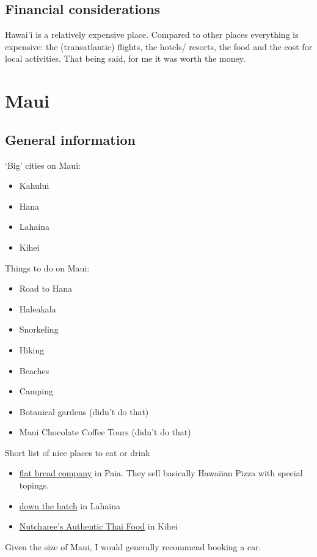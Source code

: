 \documentclass[11pt,a4paper,sans,english]{article}
\begin{document}
\subsection{Financial considerations}
Hawai'i is a relatively expensive place. Compared to other places everything is expensive: the (transatlantic) flights, the hotels/ resorts, the food and the cost for local activities.
That being said, for me it was worth the money.
\section{Maui}
\subsection{General information}
`Big' cities on Maui:
\begin{itemize}
	\itemsep-0.5em 
	\item Kahului
	\item Hana
	\item Lahaina
	\item Kihei
\end{itemize}
Things to do on Maui:
\begin{itemize}
	\itemsep-0.5em 
	\item Road to Hana
	\item Haleakala
	\item Snorkeling
	\item Hiking
	\item Beaches
	\item Camping
	\item Botanical gardens (didn't do that)
	\item Maui Chocolate Coffee Tours (didn't do that)
\end{itemize}
Short list of nice places to eat or drink
\begin{itemize}
	\itemsep-0.5em 
	\item \href{https://flatbreadcompany.com/}{flat bread company} in Paia. They sell basically Hawaiian Pizza with special topings.
	\item \href{https://www.dthmaui.com/lunch-dinner-menu/}{down the hatch} in Lahaina
	\item \href{https://www.google.com/maps/place/Nutcharee's+Authentic+Thai+Food/@20.7489383,-156.4577975,19z/data=!4m10!1m3!2m2!1sRestaurants!6e5!3m5!1s0x7954d041fd44637b:0x745d4c979ca5c0b3!8m2!3d20.7489383!4d-156.4567032!16s%2Fg%2F11bz_2lp07}{Nutcharee's Authentic Thai Food} in Kihei
\end{itemize}
Given the size of Maui, I would generally recommend booking a car.
\end{document}
